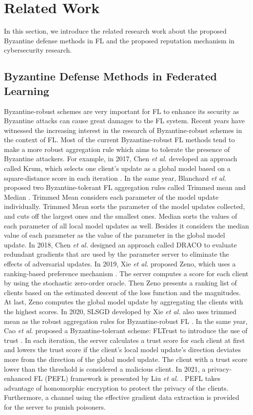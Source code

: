 \documentclass[journal]{IEEEtran}
\begin{document}
\section{Related Work}
In this section, we introduce the related research work about the proposed Byzantine defense methods in FL and the proposed reputation mechanism in cybersecurity research.
\subsection{Byzantine Defense Methods in Federated Learning}
Byzantine-robust schemes are very important for FL to enhance its security as Byzantine attacks can cause great damages to the FL system. Recent years have witnessed the increasing interest in the research of Byzantine-robust schemes in the context of FL. Most of the current Byzantine-robust FL methods tend to make a more robust aggregation rule which aims to tolerate the presence of Byzantine attackers. 
For example, in 2017, Chen \textit{et al.} developed an approach called Krum, which selects one client's update as a global model based on a square-distance score in each iteration \cite{ref_12_defense}.
In the same year, Blanchard \textit{et al}. proposed two Byzantine-tolerant FL aggregation rules called Trimmed mean and Median \cite{ref_16_defense}. Trimmed Mean considers each parameter of the model update individually. Trimmed Mean sorts the parameter of the model updates collected, and cuts off the largest ones and the smallest ones. Median sorts the values of each parameter of all local model updates as well. Besides it considers the median value of each parameter as the value of the parameter in the global model update. 
In 2018, Chen \textit{et al.} designed an approach called DRACO to evaluate redundant gradients that are used by the parameter server to eliminate the effects of adversarial updates. 
In 2019, Xie \textit{et al.} proposed Zeno, which uses a ranking-based preference mechanism \cite{ref_15_defense}. The server computes a score for each client by using the stochastic zero-order oracle. Then Zeno presents a ranking list of clients based on the estimated descent of the loss function and the magnitudes. At last, Zeno computes the global model update by aggregating the clients with the highest scores. 
In 2020, SLSGD developed by Xie \textit{et al.} also uses trimmed mean as the robust aggregation rules for Byzantine-robust FL \cite{ref_14_defense}. 
In the same year, Cao \textit{et al.} proposed a Byzantine-tolerant scheme: FLTrust to introduce the use of trust \cite{ref_17_defense}. In each iteration, the server calculates a trust score for each client at first and lowers the trust score if the client's local model update's direction deviates more from the direction of the global model update. The client with a trust score lower than the threshold is considered a malicious client.
In 2021, a privacy-enhanced FL (PEFL) framework is presented by Liu \textit{et al.}  \cite{ref_45_defense}. PEFL takes advantage of homomorphic encryption to protect the privacy of the clients. Furthermore, a channel using the effective gradient data extraction is provided for the server to punish poisoners.
\end{document}
